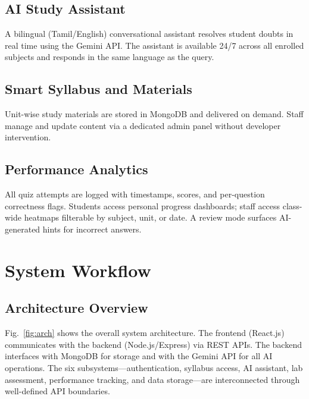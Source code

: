 \documentclass[conference]{IEEEtran}
\begin{document}
\subsection{AI Study Assistant}
A bilingual (Tamil/English) conversational assistant resolves student doubts in real time using the Gemini API. The assistant is available 24/7 across all enrolled subjects and responds in the same language as the query.

\subsection{Smart Syllabus and Materials}
Unit-wise study materials are stored in MongoDB and delivered on demand. Staff manage and update content via a dedicated admin panel without developer intervention.

\subsection{Performance Analytics}
All quiz attempts are logged with timestamps, scores, and per-question correctness flags. Students access personal progress dashboards; staff access class-wide heatmaps filterable by subject, unit, or date. A review mode surfaces AI-generated hints for incorrect answers.

\section{System Workflow}
\label{sec:workflow}

\subsection{Architecture Overview}

Fig.~\ref{fig:arch} shows the overall system architecture. The frontend (React.js) communicates with the backend (Node.js/Express) via REST APIs. The backend interfaces with MongoDB for storage and with the Gemini API for all AI operations. The six subsystems—authentication, syllabus access, AI assistant, lab assessment, performance tracking, and data storage—are interconnected through well-defined API boundaries.
\end{document}
